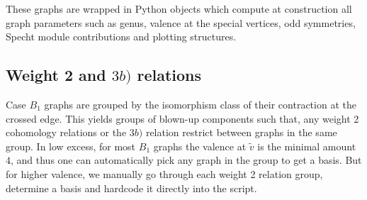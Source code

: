 These graphs are wrapped in Python objects which compute at construction all graph parameters such as genus, valence at the special vertices, odd symmetries, Specht module contributions and plotting structures.

\subsection{Weight 2 and $3b)$ relations} Case $B_1$ graphs are grouped by the isomorphism class of their contraction at the crossed edge.
This yields groups of blown-up components such that, any weight 2 cohomology relations or the $3b)$ relation restrict between graphs in the same group. In low excess, for most $B_1$ graphs the valence at $\tilde{v}$ is the minimal amount $4$, and thus one can automatically pick any graph in the group to get a basis. But for higher valence, we manually go through each weight 2 relation group, determine a basis and hardcode it directly into the script.

